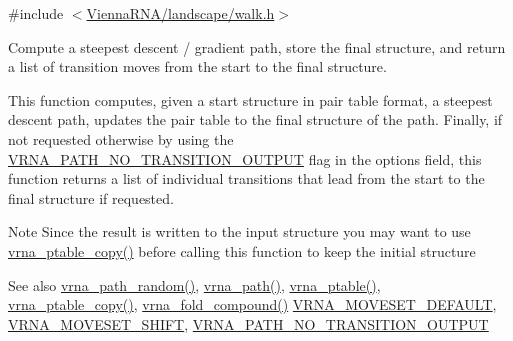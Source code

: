 {\ttfamily \#include $<$\mbox{\hyperlink{landscape_2walk_8h}{Vienna\+R\+N\+A/landscape/walk.\+h}}$>$}



Compute a steepest descent / gradient path, store the final structure, and return a list of transition moves from the start to the final structure. 

This function computes, given a start structure in pair table format, a steepest descent path, updates the pair table to the final structure of the path. Finally, if not requested otherwise by using the \mbox{\hyperlink{group__paths__walk_ga1ee63e54ecf136491e12ff03ede2622d}{V\+R\+N\+A\+\_\+\+P\+A\+T\+H\+\_\+\+N\+O\+\_\+\+T\+R\+A\+N\+S\+I\+T\+I\+O\+N\+\_\+\+O\+U\+T\+P\+UT}} flag in the {\ttfamily options} field, this function returns a list of individual transitions that lead from the start to the final structure if requested.

\begin{DoxyNote}{Note}
Since the result is written to the input structure you may want to use \mbox{\hyperlink{group__struct__utils__pair__table_ga2daefbbd6d9f8803731651882f54332d}{vrna\+\_\+ptable\+\_\+copy()}} before calling this function to keep the initial structure
\end{DoxyNote}
\begin{DoxySeeAlso}{See also}
\mbox{\hyperlink{group__paths__walk_ga98fdc3f5cfa36a12738c2ec1ce024570}{vrna\+\_\+path\+\_\+random()}}, \mbox{\hyperlink{group__paths__walk_gaef7afadc36933b80706de49fe36e7b94}{vrna\+\_\+path()}}, \mbox{\hyperlink{group__struct__utils__pair__table_gae829fb8bb7f694c12a9c0bbc34c77c60}{vrna\+\_\+ptable()}}, \mbox{\hyperlink{group__struct__utils__pair__table_ga2daefbbd6d9f8803731651882f54332d}{vrna\+\_\+ptable\+\_\+copy()}}, \mbox{\hyperlink{group__fold__compound_ga6601d994ba32b11511b36f68b08403be}{vrna\+\_\+fold\+\_\+compound()}} \mbox{\hyperlink{group__neighbors_gaa5ffec4dd0d02df320f123e6888154d1}{V\+R\+N\+A\+\_\+\+M\+O\+V\+E\+S\+E\+T\+\_\+\+D\+E\+F\+A\+U\+LT}}, \mbox{\hyperlink{group__neighbors_ga68ea27c81de4b74e48b775c04052590b}{V\+R\+N\+A\+\_\+\+M\+O\+V\+E\+S\+E\+T\+\_\+\+S\+H\+I\+FT}}, \mbox{\hyperlink{group__paths__walk_ga1ee63e54ecf136491e12ff03ede2622d}{V\+R\+N\+A\+\_\+\+P\+A\+T\+H\+\_\+\+N\+O\+\_\+\+T\+R\+A\+N\+S\+I\+T\+I\+O\+N\+\_\+\+O\+U\+T\+P\+UT}}
\end{DoxySeeAlso}

